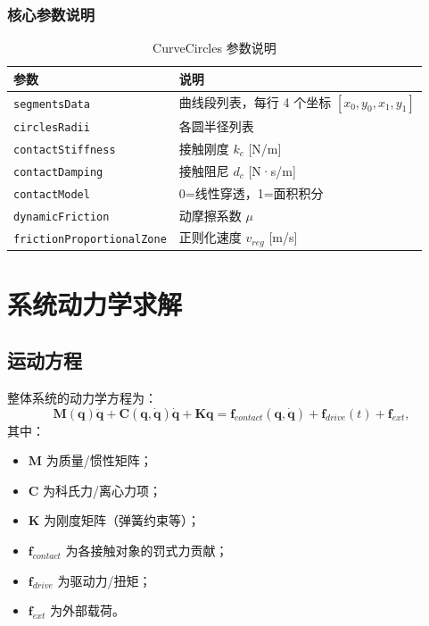 \documentclass[12pt]{ctexart}
\begin{document}
\subsubsection{核心参数说明}

\begin{table}[htbp]
\centering
\small
\begin{tabular}{lp{8cm}}
\toprule
参数 & 说明 \\ 
\midrule
\verb|segmentsData| & 曲线段列表，每行 4 个坐标 $[x_0, y_0, x_1, y_1]$ \\ 
\verb|circlesRadii| & 各圆半径列表 \\ 
\verb|contactStiffness| & 接触刚度 $k_c$ [N/m] \\ 
\verb|contactDamping| & 接触阻尼 $d_c$ [N·s/m] \\ 
\verb|contactModel| & 0=线性穿透，1=面积积分 \\ 
\verb|dynamicFriction| & 动摩擦系数 $\mu$ \\ 
\verb|frictionProportionalZone| & 正则化速度 $v_{reg}$ [m/s] \\ 
\bottomrule
\end{tabular}
\caption{CurveCircles 参数说明}
\end{table}



\section{系统动力学求解}

\subsection{运动方程}

整体系统的动力学方程为：
\begin{equation}
\mathbf{M}(\mathbf{q})\ddot{\mathbf{q}} + \mathbf{C}(\mathbf{q}, \dot{\mathbf{q}})\dot{\mathbf{q}} + \mathbf{K}\mathbf{q} = \mathbf{f}_{contact}(\mathbf{q}, \dot{\mathbf{q}}) + \mathbf{f}_{drive}(t) + \mathbf{f}_{ext},
\end{equation}
其中：
\begin{itemize}
  \item $\mathbf{M}$ 为质量/惯性矩阵；
  \item $\mathbf{C}$ 为科氏力/离心力项；
  \item $\mathbf{K}$ 为刚度矩阵（弹簧约束等）；
  \item $\mathbf{f}_{contact}$ 为各接触对象的罚式力贡献；
  \item $\mathbf{f}_{drive}$ 为驱动力/扭矩；
  \item $\mathbf{f}_{ext}$ 为外部载荷。
\end{itemize}
\end{document}
